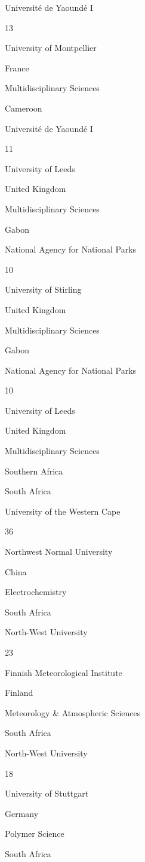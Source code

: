 \documentclass[
]{book}
\begin{document}
{Université de Yaoundé I }

{13}

{University of Montpellier }

{France }

{Multidisciplinary Sciences }

{Cameroon }

{Université de Yaoundé I }

{11}

{University of Leeds }

{United Kingdom}

{Multidisciplinary Sciences }

{Gabon }

{National Agency for National Parks}

{10}

{University of Stirling }

{United Kingdom}

{Multidisciplinary Sciences }

{Gabon }

{National Agency for National Parks}

{10}

{University of Leeds }

{United Kingdom}

{Multidisciplinary Sciences }

Southern Africa

{South Africa}

{University of the Western Cape }

{36}

{Northwest Normal University }

{China }

{Electrochemistry }

{South Africa}

{North-West University }

{23}

{Finnish Meteorological Institute}

{Finland }

{Meteorology \& Atmospheric Sciences }

{South Africa}

{North-West University }

{18}

{University of Stuttgart }

{Germany }

{Polymer Science }

{South Africa}
\end{document}
